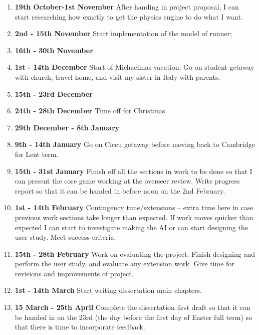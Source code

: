 \documentclass[12pt,a4paper,twoside]{article}
\begin{document}
\begin{enumerate}
\item \textbf{19th October-1st November} After handing in project proposal, I can start researching how exactly to get the physics engine to do what I want. 

\item \textbf{2nd - 15th November} Start implementation of the model of runner; \WorkA
\WorkB


\item \textbf{16th - 30th November}
\WorkC
\WorkD

\item \textbf{1st - 14th December}
Start of Michaelmas vacation: Go on student getaway with church, travel home, and visit my sister in Italy with parents.
\item \textbf{15th - 23rd December}
\WorkE
\WorkF
\item \textbf{24th - 28th December}
Time off for Christmas
\item \textbf{29th December - 8th January}
\WorkG
\WorkH
\item \textbf{9th - 14th January}
Go on Ciccu getaway before moving back to Cambridge for Lent term.

\item \textbf{15th - 31st January}
Finish off all the sections in work to be done so that I can present the core game working at the overseer review.
Write progress report so that it can be handed in before noon on the 2nd February.

\item \textbf{1st - 14th February}
Contingency time/extensions -- extra time here in case previous work sections take longer than expected. If work moves quicker than expected I can start to investigate making the AI or can start designing the user study.
Meet success criteria.


\item \textbf{15th - 28th February}
Work on evaluating the project. Finish designing and perform the user study, and evaluate any extension work.
Give time for revisions and improvements of project.

\item \textbf{1st - 14th March}
Start writing dissertation main chapters.


\item \textbf{15 March - 25th April}
Complete the dissertation first draft so that it can be handed in on the 23rd (the day before the first day of Easter full term) so that there is time to incorporate feedback.


\end{enumerate}
\end{document}
